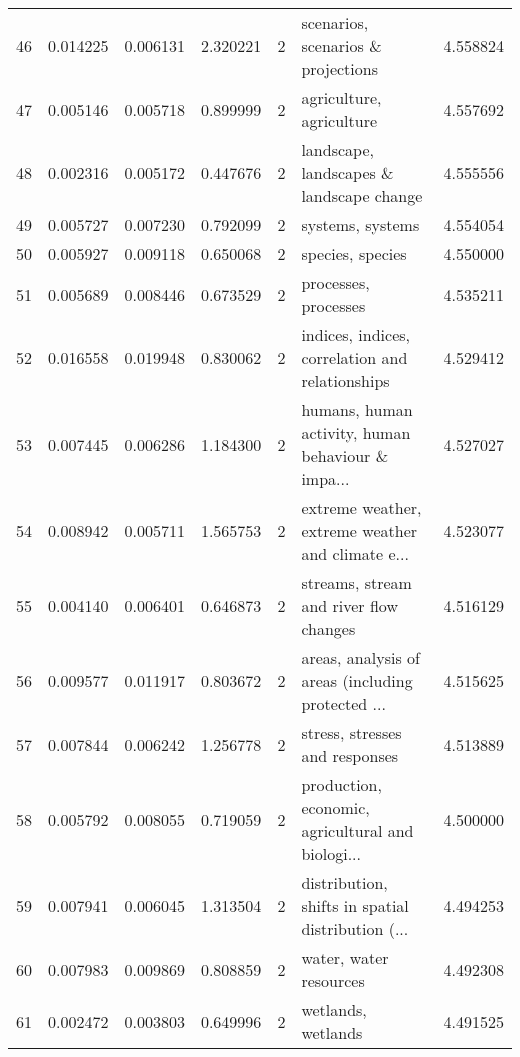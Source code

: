 \begin{tabular}{lrrrrlr}
46  &    0.014225 &  0.006131 &        2.320221 &           2 &                 scenarios, scenarios \& projections &  4.558824 \\
47  &    0.005146 &  0.005718 &        0.899999 &           2 &                           agriculture, agriculture &  4.557692 \\
48  &    0.002316 &  0.005172 &        0.447676 &           2 &           landscape, landscapes \& landscape change &  4.555556 \\
49  &    0.005727 &  0.007230 &        0.792099 &           2 &                                   systems, systems &  4.554054 \\
50  &    0.005927 &  0.009118 &        0.650068 &           2 &                                   species, species &  4.550000 \\
51  &    0.005689 &  0.008446 &        0.673529 &           2 &                               processes, processes &  4.535211 \\
52  &    0.016558 &  0.019948 &        0.830062 &           2 &    indices, indices, correlation and relationships &  4.529412 \\
53  &    0.007445 &  0.006286 &        1.184300 &           2 &  humans, human activity, human behaviour \& impa... &  4.527027 \\
54  &    0.008942 &  0.005711 &        1.565753 &           2 &  extreme weather, extreme weather and climate e... &  4.523077 \\
55  &    0.004140 &  0.006401 &        0.646873 &           2 &             streams, stream and river flow changes &  4.516129 \\
56  &    0.009577 &  0.011917 &        0.803672 &           2 &  areas, analysis of areas (including protected ... &  4.515625 \\
57  &    0.007844 &  0.006242 &        1.256778 &           2 &                     stress, stresses and responses &  4.513889 \\
58  &    0.005792 &  0.008055 &        0.719059 &           2 &  production, economic, agricultural and biologi... &  4.500000 \\
59  &    0.007941 &  0.006045 &        1.313504 &           2 &  distribution, shifts in spatial distribution (... &  4.494253 \\
60  &    0.007983 &  0.009869 &        0.808859 &           2 &                             water, water resources &  4.492308 \\
61  &    0.002472 &  0.003803 &        0.649996 &           2 &                                 wetlands, wetlands &  4.491525 \\

\end{tabular}
